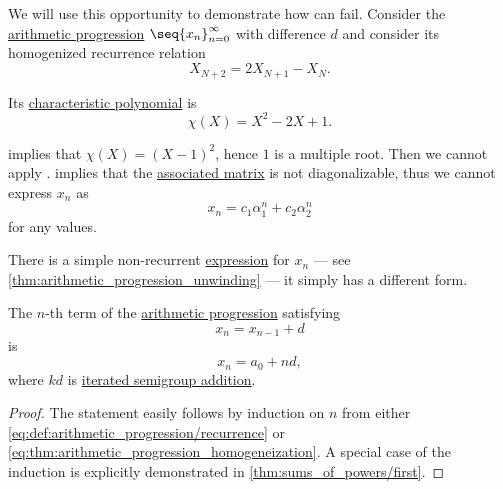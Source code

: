 \begin{example}\label{ex:arithmetic_progression_unwinding_as_recurrence}
  We will use this opportunity to demonstrate how  can fail. Consider the \hyperref[def:arithmetic_progression]{arithmetic progression} \( \seq{ x_n }_{n=0}^\infty \) with difference \( d \) and consider its homogenized recurrence relation
  \begin{equation*}
    X_{N+2} = 2 X_{N+1} - X_N.
  \end{equation*}

  Its \hyperref[def:linear_recurrence_characteristic_polynomial]{characteristic polynomial} is
  \begin{equation*}
    \chi(X) = X^2 - 2 X + 1.
  \end{equation*}

   implies that \( \chi(X) = (X - 1)^2 \), hence \( 1 \) is a multiple root. Then we cannot apply .  implies that the \hyperref[def:homogeneous_linear_recurrence_matrix]{associated matrix} is not diagonalizable, thus we cannot express \( x_n \) as
  \begin{equation*}
    x_n = c_1 \alpha_1^n + c_2 \alpha_2^n
  \end{equation*}
  for any values.

  There is a simple non-recurrent \hyperref[con:expression]{expression}  for \( x_n \) --- see \cref{thm:arithmetic_progression_unwinding} --- it simply has a different form.
\end{example}

\begin{proposition}\label{thm:arithmetic_progression_unwinding}
  The \( n \)-th term of the \hyperref[def:arithmetic_progression]{arithmetic progression} satisfying
  \begin{equation*}
    x_n = x_{n-1} + d
  \end{equation*}
  is
  \begin{equation*}
    x_n = a_0 + nd,
  \end{equation*}
  where \( kd \) is \hyperref[def:additive_semigroup/iterated]{iterated semigroup addition}.
\end{proposition}
\begin{proof}
  The statement easily follows by induction on \( n \) from either \eqref{eq:def:arithmetic_progression/recurrence} or \eqref{eq:thm:arithmetic_progression_homogeneization}. A special case of the induction is explicitly demonstrated in \cref{thm:sums_of_powers/first}.
\end{proof}

